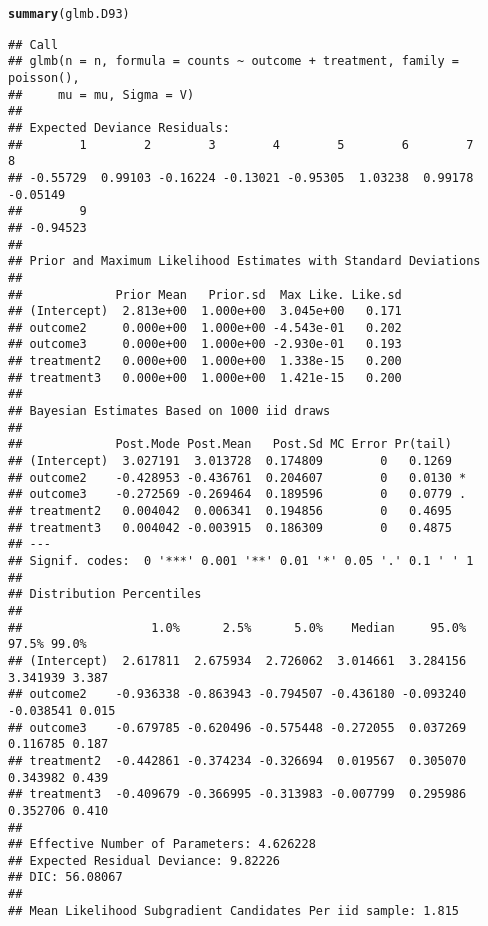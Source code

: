 \documentclass{article}\usepackage[]{graphicx}\usepackage[]{color}
\makeatletter
\newcommand{\hlstd}[1]{\textcolor[rgb]{0.345,0.345,0.345}{#1}}%
\newcommand{\hlkwd}[1]{\textcolor[rgb]{0.737,0.353,0.396}{\textbf{#1}}}%
\newenvironment{kframe}{%
 \def\at@end@of@kframe{}%
 \ifinner\ifhmode%
  \def\at@end@of@kframe{\end{minipage}}%
  \begin{minipage}{\columnwidth}%
 \fi\fi%
 \def\FrameCommand##1{\hskip\@totalleftmargin \hskip-\fboxsep
 \colorbox{shadecolor}{##1}\hskip-\fboxsep
     \hskip-\linewidth \hskip-\@totalleftmargin \hskip\columnwidth}%
 \MakeFramed {\advance\hsize-\width
   \@totalleftmargin\z@ \linewidth\hsize
   \@setminipage}}%
 {\par\unskip\endMakeFramed%
 \at@end@of@kframe}
\newenvironment{knitrout}{}{} %
\makeatother
\begin{document}
\begin{knitrout}
\color{fgcolor}\begin{kframe}
\begin{alltt}
\hlkwd{summary}\hlstd{(glmb.D93)}
\end{alltt}
\begin{verbatim}
## Call
## glmb(n = n, formula = counts ~ outcome + treatment, family = poisson(), 
##     mu = mu, Sigma = V)
## 
## Expected Deviance Residuals:
##        1        2        3        4        5        6        7        8 
## -0.55729  0.99103 -0.16224 -0.13021 -0.95305  1.03238  0.99178 -0.05149 
##        9 
## -0.94523 
## 
## Prior and Maximum Likelihood Estimates with Standard Deviations
## 
##             Prior Mean   Prior.sd  Max Like. Like.sd
## (Intercept)  2.813e+00  1.000e+00  3.045e+00   0.171
## outcome2     0.000e+00  1.000e+00 -4.543e-01   0.202
## outcome3     0.000e+00  1.000e+00 -2.930e-01   0.193
## treatment2   0.000e+00  1.000e+00  1.338e-15   0.200
## treatment3   0.000e+00  1.000e+00  1.421e-15   0.200
## 
## Bayesian Estimates Based on 1000 iid draws
## 
##             Post.Mode Post.Mean   Post.Sd MC Error Pr(tail)  
## (Intercept)  3.027191  3.013728  0.174809        0   0.1269  
## outcome2    -0.428953 -0.436761  0.204607        0   0.0130 *
## outcome3    -0.272569 -0.269464  0.189596        0   0.0779 .
## treatment2   0.004042  0.006341  0.194856        0   0.4695  
## treatment3   0.004042 -0.003915  0.186309        0   0.4875  
## ---
## Signif. codes:  0 '***' 0.001 '**' 0.01 '*' 0.05 '.' 0.1 ' ' 1
## 
## Distribution Percentiles
## 
##                  1.0%      2.5%      5.0%    Median     95.0%     97.5% 99.0%
## (Intercept)  2.617811  2.675934  2.726062  3.014661  3.284156  3.341939 3.387
## outcome2    -0.936338 -0.863943 -0.794507 -0.436180 -0.093240 -0.038541 0.015
## outcome3    -0.679785 -0.620496 -0.575448 -0.272055  0.037269  0.116785 0.187
## treatment2  -0.442861 -0.374234 -0.326694  0.019567  0.305070  0.343982 0.439
## treatment3  -0.409679 -0.366995 -0.313983 -0.007799  0.295986  0.352706 0.410
## 
## Effective Number of Parameters: 4.626228 
## Expected Residual Deviance: 9.82226 
## DIC: 56.08067 
## 
## Mean Likelihood Subgradient Candidates Per iid sample: 1.815
\end{verbatim}
\end{kframe}
\end{knitrout}
\end{document}
